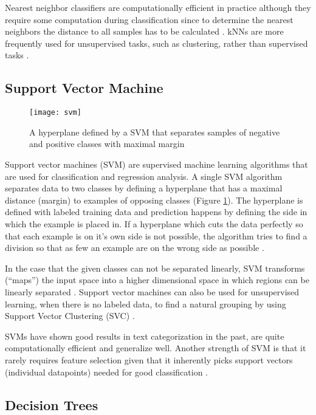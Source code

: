 Nearest neighbor classifiers are computationally efficient in practice although they require some computation during classification since to determine the nearest neighbors the distance to all samples has to be calculated \cite{hotho}.
kNNs are more frequently used for unsupervised tasks, such as clustering, rather than supervised tasks \cite{rigutini2004}.



\subsection{Support Vector Machine} \label{Support Vector Machine}
\begin{figure}[t]
\texttt{[image: svm]}
\centering
\caption{A hyperplane defined by a SVM that separates samples of negative and positive classes with maximal margin}
\label{fig:svm}
\end{figure}

Support vector machines (SVM) are supervised machine learning algorithms that are used for classification and regression analysis.
A single SVM algorithm separates data to two classes by defining a hyperplane that has a maximal distance (margin) to examples of opposing classes (Figure \ref{fig:svm}).
The hyperplane is defined with labeled training data and prediction happens by defining the side in which the example is placed in. If a hyperplane which cuts the data perfectly so that each example is on it's own side is not possible, the algorithm tries to find a division so that as few an example are on the wrong side as possible \cite{hotho}.

In the case that the given classes can not be separated linearly, SVM transforms (``maps'') the input space into a higher dimensional space in which regions can be linearly separated \cite{rigutini2004}.
Support vector machines can also be used for unsupervised learning, when there is no labeled data, to find a natural grouping by using Support Vector Clustering (SVC) \cite{ben-hur2001}.

SVMs have shown good results in text categorization in the past, are quite computationally efficient and generalize well.
Another strength of SVM is that it rarely requires feature selection given that it inherently picks support vectors (individual datapoints) needed for good classification \cite{hotho}.

\subsection{Decision Trees} \label{Decision Trees}

